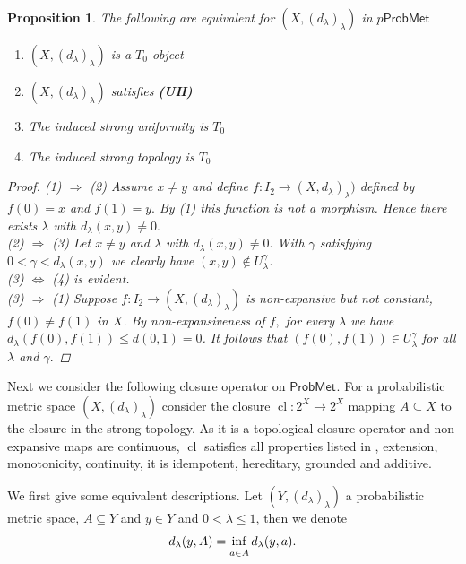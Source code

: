 \documentclass[12pt,a4paper]{amsart}
\theoremstyle{theorem}
\newtheorem{proposition}[theorem]{Proposition}
\theoremstyle{definition}
\newcommand{\PM}{\ensuremath{\mathsf{ProbMet_{}}}}
\renewcommand{\inf}{\myinf}
\DeclareMathOperator{\cl}{cl}
\DeclareMathOperator*{\myinf}{in\vphantom{p}f}
\renewcommand{\l}{\ensuremath{\lambda}}
\def\rw{\rightarrow}
\begin{document}
{\begin{proposition}
The following are equivalent for $(X, (d_\l)_\l)$ in $p\PM$
\begin {enumerate}
\item $(X, (d_\l)_\l)$ is a $T_0$-object
\item $(X, (d_\l)_\l)$ satisfies {\bf(UH)}
\item The induced strong uniformity is $T_0$
\item The induced strong topology is $T_0$
\end{enumerate}
\begin{proof}
(1) $\Rightarrow$ (2) Assume $x \not = y$ and define $f: I_2 \rw (X, d_\l)_\l)$ defined by $f(0)= x$ and $f(1) = y.$ By (1) this function is not a morphism. Hence there exists $\l$ with $d_\l (x,y) \not = 0.$\\
(2) $\Rightarrow$ (3) Let $x \not = y$ and $\l$ with $d_\l (x,y) \not = 0.$ With $\gamma$ satisfying $0 < \gamma < d_\l(x,y)$ we clearly have $(x,y) \not \in U_\l^\gamma$.\\
(3) $\Leftrightarrow$ (4) is evident.\\
(3) $\Rightarrow$ (1) Suppose $f: I_2 \rw (X, (d_\l)_\l)$ is non-expansive but not constant, $f(0) \not = f(1)$ in $X$. By non-expansiveness of $f,$ for every $\l$ we have $d_\l(f(0), f(1)) \leq d(0,1) = 0$. It follows that $(f(0), f(1)) \in U_\l^\gamma$ for all $\l$ and $\gamma.$
\end{proof}
\end{proposition}

Next we consider the following closure operator on $\PM$.
For a probabilistic metric space $(X, (d_\l)_\l)$ consider the closure $\cl: 2^X \rw 2^X$ mapping $A \subseteq X$ to the closure in the strong topology. As it is a topological closure operator and non-expansive maps are continuous, $\cl$ satisfies all properties listed in \cite{DT}, extension, monotonicity, continuity, it is idempotent, hereditary, grounded and additive.

We first give some equivalent descriptions. Let $(Y, (d_\l)_\l)$ a probabilistic metric space, $A \subseteq Y$ and $y \in Y$ and $0< \l \leq 1$, then we denote
$$
d_\l(y, A) = \inf_{a\in A} d_\l(y,a).
$$

}
\end{document}
